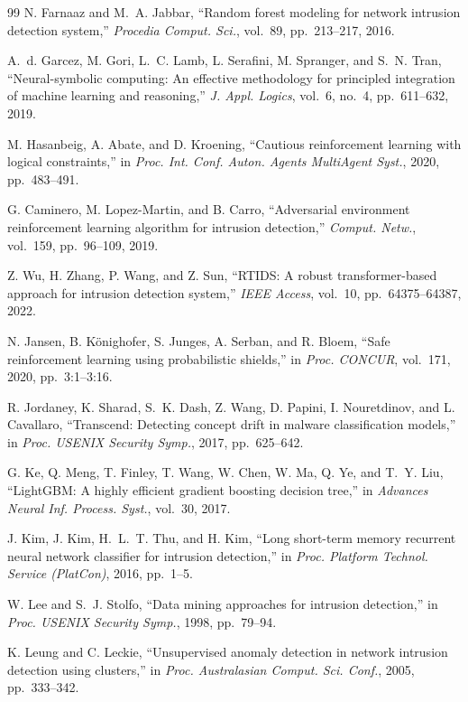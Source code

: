 \documentclass[12pt, letterpaper, oneside]{report}
\begin{document}
\begin{thebibliography}{99}
N. Farnaaz and M.~A. Jabbar, ``Random forest modeling for network intrusion detection system,'' \textit{Procedia Comput. Sci.}, vol.~89, pp.~213--217, 2016.

A.~d. Garcez, M. Gori, L.~C. Lamb, L. Serafini, M. Spranger, and S.~N. Tran, ``Neural-symbolic computing: An effective methodology for principled integration of machine learning and reasoning,'' \textit{J. Appl. Logics}, vol.~6, no.~4, pp.~611--632, 2019.

M. Hasanbeig, A. Abate, and D. Kroening, ``Cautious reinforcement learning with logical constraints,'' in \textit{Proc. Int. Conf. Auton. Agents MultiAgent Syst.}, 2020, pp.~483--491.

G. Caminero, M. Lopez-Martin, and B. Carro, ``Adversarial environment reinforcement learning algorithm for intrusion detection,'' \textit{Comput. Netw.}, vol.~159, pp.~96--109, 2019.

Z. Wu, H. Zhang, P. Wang, and Z. Sun, ``RTIDS: A robust transformer-based approach for intrusion detection system,'' \textit{IEEE Access}, vol.~10, pp.~64375--64387, 2022.

N. Jansen, B. K{\"o}nighofer, S. Junges, A. Serban, and R. Bloem, ``Safe reinforcement learning using probabilistic shields,'' in \textit{Proc. CONCUR}, vol.~171, 2020, pp.~3:1--3:16.

R. Jordaney, K. Sharad, S.~K. Dash, Z. Wang, D. Papini, I. Nouretdinov, and L. Cavallaro, ``Transcend: Detecting concept drift in malware classification models,'' in \textit{Proc. USENIX Security Symp.}, 2017, pp.~625--642.

G. Ke, Q. Meng, T. Finley, T. Wang, W. Chen, W. Ma, Q. Ye, and T.~Y. Liu, ``LightGBM: A highly efficient gradient boosting decision tree,'' in \textit{Advances Neural Inf. Process. Syst.}, vol.~30, 2017.

J. Kim, J. Kim, H.~L.~T. Thu, and H. Kim, ``Long short-term memory recurrent neural network classifier for intrusion detection,'' in \textit{Proc. Platform Technol. Service (PlatCon)}, 2016, pp.~1--5.

W. Lee and S.~J. Stolfo, ``Data mining approaches for intrusion detection,'' in \textit{Proc. USENIX Security Symp.}, 1998, pp.~79--94.

K. Leung and C. Leckie, ``Unsupervised anomaly detection in network intrusion detection using clusters,'' in \textit{Proc. Australasian Comput. Sci. Conf.}, 2005, pp.~333--342.


\end{thebibliography}
\end{document}
